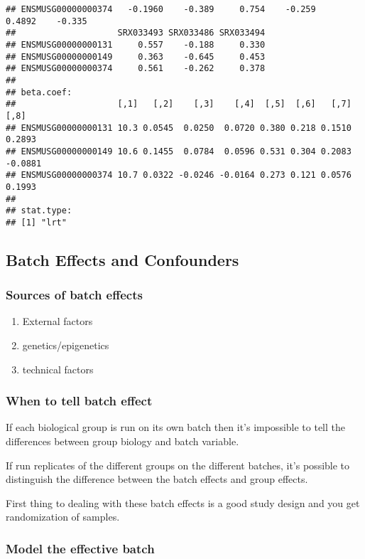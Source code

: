 \documentclass[]{article}
\providecommand{\tightlist}{%
  \setlength{\itemsep}{0pt}\setlength{\parskip}{0pt}}
\begin{document}
\begin{verbatim}
## ENSMUSG00000000374   -0.1960    -0.389     0.754    -0.259    0.4892    -0.335
##                    SRX033493 SRX033486 SRX033494
## ENSMUSG00000000131     0.557    -0.188     0.330
## ENSMUSG00000000149     0.363    -0.645     0.453
## ENSMUSG00000000374     0.561    -0.262     0.378
## 
## beta.coef: 
##                    [,1]   [,2]    [,3]    [,4]  [,5]  [,6]   [,7]    [,8]
## ENSMUSG00000000131 10.3 0.0545  0.0250  0.0720 0.380 0.218 0.1510  0.2893
## ENSMUSG00000000149 10.6 0.1455  0.0784  0.0596 0.531 0.304 0.2083 -0.0881
## ENSMUSG00000000374 10.7 0.0322 -0.0246 -0.0164 0.273 0.121 0.0576  0.1993
## 
## stat.type: 
## [1] "lrt"
\end{verbatim}

\subsection{Batch Effects and
Confounders}\label{batch-effects-and-confounders}

\subsubsection{Sources of batch effects}\label{sources-of-batch-effects}

\begin{enumerate}
\def\labelenumi{\arabic{enumi}.}
\tightlist
\item
  External factors
\item
  genetics/epigenetics
\item
  technical factors
\end{enumerate}

\subsubsection{When to tell batch
effect}\label{when-to-tell-batch-effect}

If each biological group is run on its own batch then it's impossible to
tell the differences between group biology and batch variable.

If run replicates of the different groups on the different batches, it's
possible to distinguish the difference between the batch effects and
group effects.

First thing to dealing with these batch effects is a good study design
and you get randomization of samples.

\subsubsection{Model the effective
batch}\label{model-the-effective-batch}
\end{document}

